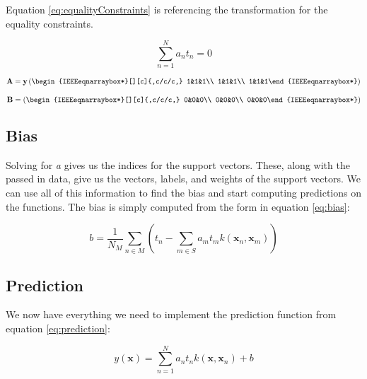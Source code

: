 \documentclass[journal]{IEEEtran}
\begin{document}
    Equation \ref{eq:equalityConstraints} is referencing the transformation for the equality constraints.

    \begin{equation}
    \label{eq:equalityConstraints}
    \sum\limits_{n = 1}^Na_n t_n = 0
    \end{equation}

    \begin{equation}
    \mathbf{A} = \mathbf{y} \left(\begin{IEEEeqnarraybox*}[][c]{,c/c/c,}
    1&1&1\\
    1&1&1\\
    1&1&1%
    \end{IEEEeqnarraybox*}\right)
    \end{equation}

    \begin{equation}
    \mathbf{B} = \left(\begin{IEEEeqnarraybox*}[][c]{,c/c/c,}
    0&0&0\\
    0&0&0\\
    0&0&0%
    \end{IEEEeqnarraybox*}\right)
    \end{equation}

    \subsection{Bias}
    Solving for \textit{a} gives us the indices for the support vectors. These, along with the passed in data, give us the vectors, labels, and weights of the support vectors. We can use all of this information to find the bias and start computing predictions on the functions. The bias is simply computed from the form in equation \ref{eq:bias}:

    \begin{equation}
    \label{eq:bias}
    b = \frac{1}{N_M} \sum\limits_{n \in M} (t_n - \sum\limits_{m \in S} a_m t_m k(\mathbf{x}_n, \mathbf{x}_m))
    \end{equation}

    \subsection{Prediction}
    We now have everything we need to implement the prediction function from equation \ref{eq:prediction}:

    \begin{equation}
    \label{eq:prediction}
    y(\mathbf{x}) = \sum\limits_{n = 1}^N a_n t_n k(\mathbf{x}, \mathbf{x}_n) + b
    \end{equation}
\end{document}
